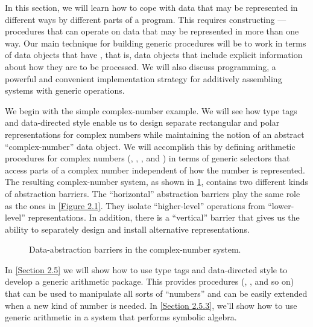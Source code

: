 In this section, we will learn how to cope with data that may be represented in different ways by different parts of a program.
This requires constructing ---procedures that can operate on data that may be represented in more than one way.
Our main technique for building generic procedures will be to work in terms of data objects that have , that is, data objects that include explicit information about how they are to be processed.
We will also discuss  programming, a powerful and convenient implementation strategy for additively assembling systems with generic operations.

We begin with the simple complex-number example.
We will see how type tags and data-directed style enable us to design separate rectangular and polar representations for complex numbers while maintaining the notion of an abstract “complex-number” data object.
We will accomplish this by defining arithmetic procedures for complex numbers (, , , and ) in terms of generic selectors that access parts of a complex number independent of how the number is represented.
The resulting complex-number system, as shown in \cref{Figure 2.19}, contains two different kinds of abstraction barriers.
The “horizontal” abstraction barriers play the same role as the ones in \cref{Figure 2.1}.
They isolate “higher-level” operations from “lower-level” representations.
In addition, there is a “vertical” barrier that gives us the ability to separately design and install alternative representations.

\begin{figure}[tb]
	\centering
	
	\caption{
		Data-abstraction barriers in the complex-number system.
	}
	\label{Figure 2.19}
\end{figure}

In \cref{Section 2.5} we will show how to use type tags and data-directed style to develop a generic arithmetic package.
This provides procedures (, , and so on) that can be used to manipulate all sorts of “numbers” and can be easily extended when a new kind of number is needed.
In \cref{Section 2.5.3}, we’ll show how to use generic arithmetic in a system that performs symbolic algebra.




